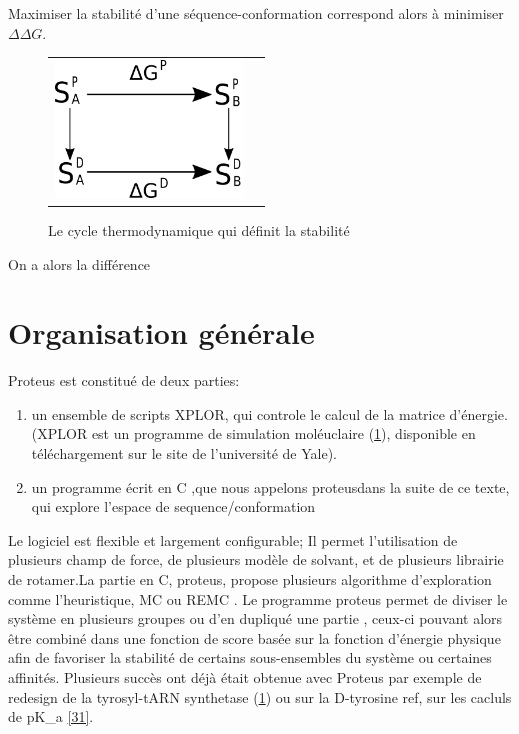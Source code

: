 Maximiser la stabilité d'une séquence-conformation correspond alors à minimiser $\Delta \Delta G$.

   \begin{figure}[!htbp]
     \centering
     \begin{tabular}{cc}
       \includegraphics[width=5cm]{figure/cycleThermo.png} &
     \end{tabular}
     
     \caption{Le cycle thermodynamique qui définit la stabilité}
\label{graph:struct_Phy}
   \end{figure}

On a alors la différence 


\section{Organisation générale}

Proteus est constitué de deux parties:

\begin{enumerate}
\item un ensemble de scripts XPLOR, qui controle le calcul de la matrice d'énergie. (XPLOR est un programme de simulation moléuclaire (\ref{}), disponible en téléchargement sur le site de l'université de Yale).
\item un programme écrit en C ,que nous appelons \og proteus\fg dans la suite de ce texte, qui explore l'espace de sequence/conformation
\end{enumerate}

Le logiciel est flexible et largement configurable; Il permet l'utilisation de plusieurs champ de force, de plusieurs modèle de solvant, et de plusieurs librairie de rotamer.La partie en C, proteus, propose plusieurs algorithme d'exploration comme l'heuristique, MC ou REMC . Le programme proteus permet de diviser le système en plusieurs groupes ou d'en dupliqué une partie , ceux-ci pouvant alors être combiné dans une fonction de score basée sur la fonction d'énergie physique afin de favoriser la stabilité de certains sous-ensembles du système ou certaines affinités.
Plusieurs succès ont déjà était obtenue avec Proteus par exemple de redesign de la tyrosyl-tARN synthetase (\ref{}) ou sur la D-tyrosine ref{}, sur les cacluls de pK_a \ref{31}.

